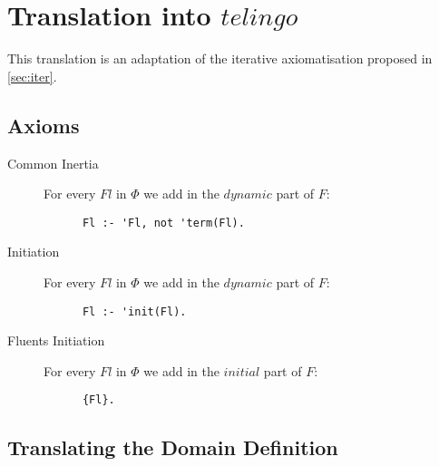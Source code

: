 \section{Translation into $telingo$}\label{sec:translation_telingo}

This translation is an adaptation of the iterative axiomatisation proposed in \ref{sec:iter}.

\subsection{Axioms}

\begin{description}
  \item[Common Inertia]
    For every $Fl$ in $\Phi$ we add in the $dynamic$ part of $F$:
    \begin{lstlisting}
      Fl :- 'Fl, not 'term(Fl).
    \end{lstlisting}
  \item[Initiation]
    For every $Fl$ in $\Phi$ we add in the $dynamic$ part of $F$:
    \begin{lstlisting}
      Fl :- 'init(Fl).
    \end{lstlisting}
  \item[Fluents Initiation]
    For every $Fl$ in $\Phi$ we add in the $initial$ part of $F$:
    \begin{lstlisting}
      {Fl}.
    \end{lstlisting}
\end{description}

\subsection{Translating the Domain Definition}


